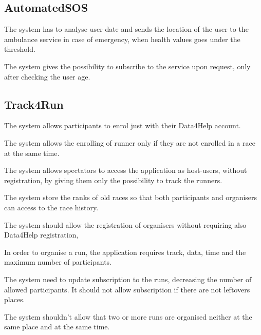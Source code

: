 \subsection{AutomatedSOS}

\begin{enumerate}[label={[}R2.\arabic*{]}]

    \item The system has to analyse user date and sends the location of the user to the ambulance service in case of emergency, when health values goes under the threshold.
    
    \item The system gives the possibility to subscribe to the service upon request, only after checking the user age.
\end{enumerate}


\subsection{Track4Run }

\begin{enumerate}[label={[}R3.\arabic*{]}]

    \item The system allows participants to enrol just with their Data4Help account.
    
    \item The system allows the enrolling of runner only if they are not enrolled in a race at the same time.
    
    \item The system allows spectators to access the application as host-users, without registration, by giving them only the possibility to track the runners.
    
    \item The system store the ranks of old races so that both participants and organisers can access to the race history.
    
    \item The system should allow the registration of organisers without requiring also Data4Help registration,
    
    \item In order to organise a run, the application requires track, data, time and the maximum number of participants.
    
    \item The system need to update subscription to the runs, decreasing the number of allowed participants. It should not allow subscription if there are not leftovers places.
    
    \item The system shouldn't allow that two or more runs are organised neither at the same place and at the same time.

\end{enumerate}